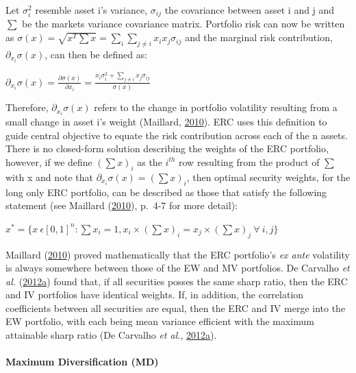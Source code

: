 \documentclass[11pt,preprint, authoryear]{elsarticle}
\numberwithin{equation}{section}
\numberwithin{figure}{section}
\numberwithin{table}{section}
\begin{document}
Let \(\sigma_i^2\) resemble asset i's variance, \(\sigma_{ij}\) the
covariance between asset i and j and \(\sum\) be the markets variance
covariance matrix. Portfolio risk can now be written as
\(\sigma(x)=\sqrt{x^T\sum x}=\sum_i\sum_{j\neq i}x_ix_j\sigma_{ij}\) and
the marginal risk contribution, \(\partial_{x_i}\sigma(x)\), can then be
defined as:

\begin{center}
$\partial_{x_i}\sigma(x)=\frac{\partial\sigma(x)}{\partial x_i}=\frac{x_i\sigma_i^2+\sum_{j\neq i}x_j\sigma_{ij}}{\sigma(x)}$ 
\end{center}

Therefore, \(\partial_{x_i}\sigma(x)\) refers to the change in portfolio
volatility resulting from a small change in asset i's weight (Maillard,
\protect\hyperlink{ref-maillard2010}{2010}). ERC uses this definition to
guide central objective to equate the risk contribution across each of
the n assets. There is no closed-form solution describing the weights of
the ERC portfolio, however, if we define \((\sum x)_i\) as the
\(i^{th}\) row resulting from the product of \(\sum\) with x and note
that \(\partial_{x_i}\sigma(x)=(\sum x)_i\), then optimal security
weights, for the long only ERC portfolio, can be described as those that
satisfy the following statement (see Maillard
(\protect\hyperlink{ref-maillard2010}{2010}), p.~4-7 for more detail):

\begin{center}
$x^*=\{x \ \epsilon[0,1]^n:\sum x_i=1, x_i \times (\sum x)_i=x_j \times (\sum x)_j \ \forall  \ i,j \}$ 
\end{center}

Maillard (\protect\hyperlink{ref-maillard2010}{2010}) proved
mathematically that the ERC portfolio's \emph{ex ante} volatility is
always somewhere between those of the EW and MV portfolios. De Carvalho
\emph{et al.}
(\protect\hyperlink{ref-leote}{2012}\protect\hyperlink{ref-leote}{a})
found that, if all securities posses the same sharp ratio, then the ERC
and IV portfolios have identical weights. If, in addition, the
correlation coefficients between all securities are equal, then the ERC
and IV merge into the EW portfolio, with each being mean variance
efficient with the maximum attainable sharp ratio (De Carvalho \emph{et
al.},
\protect\hyperlink{ref-leote}{2012}\protect\hyperlink{ref-leote}{a}).

\hypertarget{maximum-diversification-md}{%
\paragraph{Maximum Diversification
(MD)}\label{maximum-diversification-md}}
\end{document}
